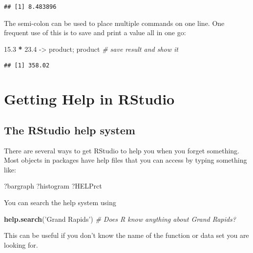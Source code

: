 \documentclass[]{book}
\newenvironment{Shaded}{\begin{snugshade}}{\end{snugshade}}
\newcommand{\CommentTok}[1]{\textcolor[rgb]{0.56,0.35,0.01}{\textit{#1}}}
\newcommand{\FloatTok}[1]{\textcolor[rgb]{0.00,0.00,0.81}{#1}}
\newcommand{\KeywordTok}[1]{\textcolor[rgb]{0.13,0.29,0.53}{\textbf{#1}}}
\newcommand{\NormalTok}[1]{#1}
\newcommand{\OperatorTok}[1]{\textcolor[rgb]{0.81,0.36,0.00}{\textbf{#1}}}
\newcommand{\StringTok}[1]{\textcolor[rgb]{0.31,0.60,0.02}{#1}}
\begin{document}
\begin{verbatim}
## [1] 8.483896
\end{verbatim}

The semi-colon can be used to place multiple commands on one line. One frequent use of this is to save and print a value all in one go:

\begin{Shaded}
\begin{Highlighting}[]
\FloatTok{15.3} \OperatorTok{*}\StringTok{ }\FloatTok{23.4}\NormalTok{ ->}\StringTok{ }\NormalTok{product; product    }\CommentTok{# save result and show it}
\end{Highlighting}
\end{Shaded}

\begin{verbatim}
## [1] 358.02
\end{verbatim}

\hypertarget{getting-help-in-rstudio}{%
\section{Getting Help in RStudio}\label{getting-help-in-rstudio}}

\hypertarget{the-rstudio-help-system}{%
\subsection{The RStudio help system}\label{the-rstudio-help-system}}

There are several ways to get RStudio to help you when you forget something. Most objects in packages have help files that you can access by typing something like:

\begin{Shaded}
\begin{Highlighting}[]
\NormalTok{?bargraph}
\NormalTok{?histogram}
\NormalTok{?HELPrct}
\end{Highlighting}
\end{Shaded}

You can search the help system using

\begin{Shaded}
\begin{Highlighting}[]
\KeywordTok{help.search}\NormalTok{(}\StringTok{'Grand Rapids'}\NormalTok{)    }\CommentTok{# Does R know anything about Grand Rapids?}
\end{Highlighting}
\end{Shaded}

This can be useful if you don't know the name of the function or data set you are looking for.
\end{document}
